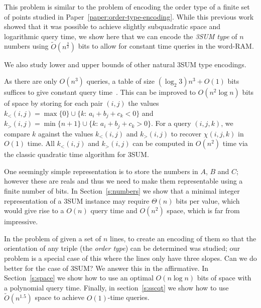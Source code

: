 This problem is similar to the problem of encoding the order
type of a finite set of points studied in Paper~\ref{paper:order-type-encoding}.
While this previous work showed that it was
possible to achieve slightly subquadratic space and logarithmic query time, we
show here that we can encode the \emph{3SUM type} of \(n\) numbers using
\(\tilde{O}(n^{\frac 32})\) bits to allow for constant time queries in the
word-RAM.

We also study lower and upper bounds of other natural 3SUM type encodings.

As there are only $O(n^3)$ queries, a table
of size $(\log_2 3) n^3 + O(1)$ bits suffices to give constant query time~\cite{DPT10}.
%
This can be improved to $O(n^2\log n)$ bits of space by
storing for each pair $(i,j)$ the values
\(k_<(i,j) = \max \{ 0\}\cup \{k \colon\, a_i + b_j + c_k < 0\}\) and
\(k_>(i,j) = \min \{ n+1\}\cup \{k \colon\, a_i + b_j + c_k > 0\}\).
For a query \((i,j,k)\), we compare \(k\) against the values \(k_<(i,j)\) and \(k_>(i,j)\)
to recover \(\chi(i,j,k)\) in \(O(1)\) time. All \(k_<(i,j)\) and \(k_>(i,j)\)
can be computed in \(O(n^2)\) time via the classic quadratic time algorithm for
3SUM.

One seemingly simple representation is to store the numbers in $A$, $B$ and
$C$; however these are reals and thus we need to make them representable using
a finite number of bits.
In Section~\ref{s:numbers} we show that a minimal integer representation of a
3SUM instance may require $\Theta(n)$ bits per value, which would give
rise to a $O(n)$ query time and $O(n^2)$ space, which is far from
impressive.
%


In \cite{CCILO18} the problem of given a set of $n$ lines, to create an
encoding of them so that the orientation of any triple (the \emph{order type})
can be determined was studied; our problem is a special case of this where the
lines only have three slopes.
Can we do better for the case of 3SUM? We answer this in the affirmative.
In Section~\ref{s:space} we show how to use an optimal $O(n \log n)$ bits of
space with a polynomial query time. Finally, in section~\ref{s:sscqt} we show
how to use $\tilde{O}(n^{1.5})$ space to achieve $O(1)$-time queries.




